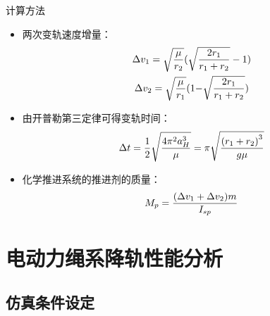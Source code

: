 \documentclass[sectioncirclenumberstyle]{le2iutbmbeamer}
\begin{document}
\begin{frame}{计算方法}
\begin{itemize}
\item 两次变轨速度增量：
\begin{gather}
\Delta {v_1} = \sqrt {\frac{\mu }{{{r_2}}}} (\sqrt {\frac{{2{r_1}}}{{{r_1} + {r_2}}}}  - 1) \notag\\
\Delta {v_2} = \sqrt {\frac{\mu }{{{r_1}}}} (1{\rm{ - }}\sqrt {\frac{{2{r_1}}}{{{r_1} + {r_2}}}} )\notag
\end{gather}
\item 由开普勒第三定律可得变轨时间：
\begin{equation}
\Delta t = \frac{1}{2}\sqrt {\frac{{4{\pi ^2}a_H^3}}{\mu }}  = \pi \sqrt {\frac{{{{({r_1} + {r_2})}^3}}}{{g\mu }}}\notag
\end{equation}\label{eq:time}
\item 化学推进系统的推进剂的质量：
\begin{equation}
{M_p} = \frac{(\Delta {v_1} + \Delta {v_2})m}{{{I_{sp}}}}\notag
\end{equation}\label{eq:M_p}
\end{itemize}
\end{frame}

\section{电动力绳系降轨性能分析}
\tableofcontentslide[sectionstyle={show/shaded},subsectionstyle={show/show/hide},subsubsectionstyle={hide/hide/hide/hide}]
\subsection{仿真条件设定}
\end{document}
